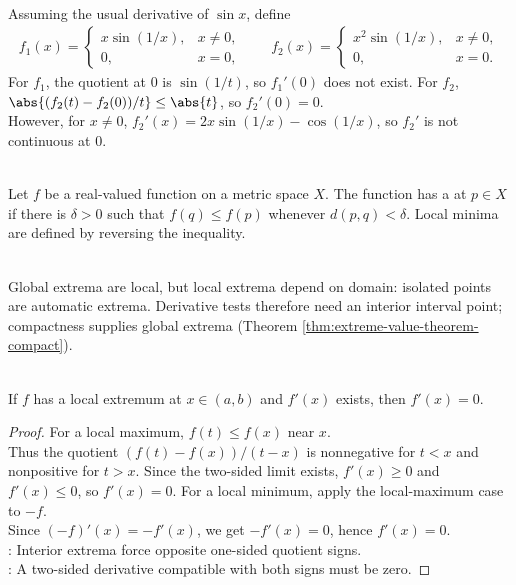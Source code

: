 \begin{example} \label{ex:oscillatory-derivative-examples} \\
Assuming the usual derivative of $\sin x$, define
\begin{align}
f_1(x)=
\begin{cases}
x\sin(1/x),&x\neq0,\\
0,&x=0,
\end{cases}
\qquad
f_2(x)=
\begin{cases}
x^2\sin(1/x),&x\neq0,\\
0,&x=0.
\end{cases}
\nonumber
\end{align}
For $f_1$, the quotient at $0$ is $\sin(1/t)$, so $f_1'(0)$ does not exist. For $f_2$, $\abs{(f_2(t)-f_2(0))/t}\leq\abs{t}$, so $f_2'(0)=0$.\\
However, for $x\neq0$, $f_2'(x)=2x\sin(1/x)-\cos(1/x)$, so $f_2'$ is not continuous at $0$.
\end{example}

\begin{definition} \label{def:local-extrema} \\
Let $f$ be a real-valued function on a metric space $X$. The function has a  at $p\in X$ if there is $\delta>0$ such that $f(q)\leq f(p)$ whenever $d(p,q)<\delta$. Local minima are defined by reversing the inequality.
\end{definition}

\begin{remark} \label{rem:local-versus-global-extrema} \\
Global extrema are local, but local extrema depend on domain: isolated points are automatic extrema. Derivative tests therefore need an interior interval point; compactness supplies global extrema (Theorem \ref{thm:extreme-value-theorem-compact}).
\end{remark}

\begin{theorem} \label{thm:interior-extremum-derivative-zero} \\
If $f$ has a local extremum at $x\in(a,b)$ and $f'(x)$ exists, then $f'(x)=0$.
\begin{proof}
For a local maximum, $f(t)\leq f(x)$ near $x$.\\
Thus the quotient $(f(t)-f(x))/(t-x)$ is nonnegative for $t<x$ and nonpositive for $t>x$. Since the two-sided limit exists, $f'(x)\geq0$ and $f'(x)\leq0$, so $f'(x)=0$. For a local minimum, apply the local-maximum case to $-f$.\\
Since $(-f)'(x)=-f'(x)$, we get $-f'(x)=0$, hence $f'(x)=0$.\\
: Interior extrema force opposite one-sided quotient signs.\\
: A two-sided derivative compatible with both signs must be zero.
\end{proof}
\end{theorem}

